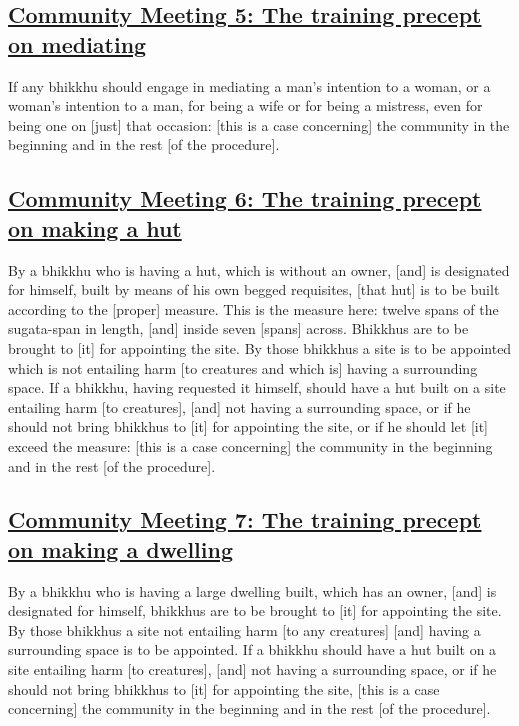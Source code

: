 \subsection*{\hyperref[sd5]{Community Meeting 5: The training precept on mediating}}
\label{comm5}
If any bhikkhu should engage in mediating a man's intention to a woman, or a woman's intention to a man, for being a wife or for being a mistress, even for being one on [just] that occasion: [this is a case concerning] the community in the beginning and in the rest [of the procedure].

\subsection*{\hyperref[sd6]{Community Meeting 6: The training precept on making a hut}}
\label{comm6}
By a bhikkhu who is having a hut, which is without an owner, [and] is designated for himself, built by means of his own begged requisites, [that hut] is to be built according to the [proper] measure. This is the measure here: twelve spans of the sugata-span in length, [and] inside seven [spans] across. Bhikkhus are to be brought to [it] for appointing the site. By those bhikkhus a site is to be appointed which is not entailing harm [to creatures and which is] having a surrounding space. If a bhikkhu, having requested it himself, should have a hut built on a site entailing harm [to creatures], [and] not having a surrounding space, or if he should not bring bhikkhus to [it] for appointing the site, or if he should let [it] exceed the measure: [this is a case concerning] the community in the beginning and in the rest [of the procedure].

\subsection*{\hyperref[sd7]{Community Meeting 7: The training precept on making a dwelling}}
\label{comm7}
By a bhikkhu who is having a large dwelling built, which has an owner, [and] is designated for himself, bhikkhus are to be brought to [it] for appointing the site. By those bhikkhus a site not entailing harm [to any creatures] [and] having a surrounding space is to be appointed. If a bhikkhu should have a hut built on a site entailing harm [to creatures], [and] not having a surrounding space, or if he should not bring bhikkhus to [it] for appointing the site, [this is a case concerning] the community in the beginning and in the rest [of the procedure].

